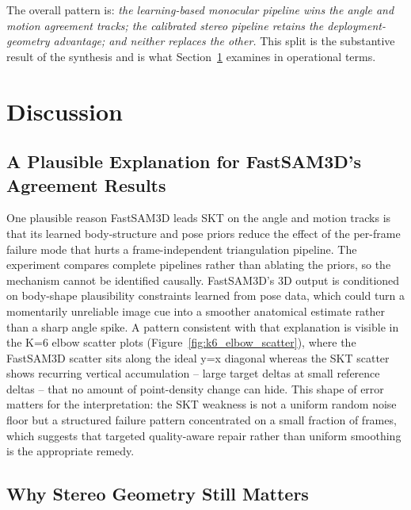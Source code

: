 \documentclass[12pt,a4paper]{article}
\begin{document}
The overall pattern is: \emph{the learning-based monocular pipeline wins
the angle and motion agreement tracks; the calibrated stereo pipeline
retains the deployment-geometry advantage; and neither replaces the other.}
This split is the substantive result of the synthesis and is what
Section~\ref{sec:discussion} examines in operational terms.

\clearpage
\section{Discussion}
\label{sec:discussion}

\subsection{A Plausible Explanation for FastSAM3D's Agreement Results}

One plausible reason FastSAM3D leads SKT on the angle and motion tracks is
that its learned body-structure and pose priors reduce the effect of the
per-frame failure mode that hurts a frame-independent triangulation
pipeline.  The experiment compares complete pipelines rather than ablating
the priors, so the mechanism cannot be identified causally.
FastSAM3D's 3D output is conditioned on body-shape plausibility constraints
learned from pose data, which could turn a momentarily unreliable image cue
into a smoother anatomical estimate rather than a sharp angle spike.  A
pattern consistent with that explanation is visible in the K=6 elbow scatter plots
(Figure~\ref{fig:k6_elbow_scatter}), where the FastSAM3D scatter sits
along the ideal y=x diagonal whereas the SKT scatter shows recurring
vertical accumulation -- large target deltas at small reference deltas --
that no amount of point-density change can hide.
This shape of error matters for the interpretation: the SKT weakness is
not a uniform random noise floor but a structured failure pattern
concentrated on a small fraction of frames, which suggests that targeted
quality-aware repair rather than uniform smoothing is the appropriate
remedy.

\subsection{Why Stereo Geometry Still Matters}
\end{document}
